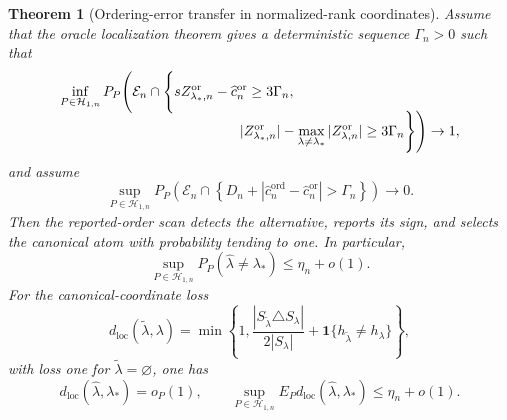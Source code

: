 \documentclass[11pt]{article}
\newtheorem{theorem}{Theorem}[section]
\theoremstyle{definition}
\newcommand{\1}{\mathbf 1}\newcommand{\op}{\operatorname}
\begin{document}
\begin{theorem}[Ordering-error transfer in normalized-rank coordinates]
Assume that the oracle localization theorem gives a deterministic
sequence $\Gamma_n>0$ such that
\begin{align}
 \inf_{P\in\mathcal H_{1,n}}
 P_P\Bigg(&\mathcal E_n\cap
 \Bigg\{
 sZ_{\lambda_*,n}^{\mathrm{or}}
   -\widehat c_n^{\mathrm{or}}\ge3\Gamma_n,
 \nonumber\\[-2mm]
 &\hspace{27mm}
 |Z_{\lambda_*,n}^{\mathrm{or}}|
 -\max_{\lambda\ne\lambda_*}
  |Z_{\lambda,n}^{\mathrm{or}}|
 \ge3\Gamma_n
 \Bigg\}\Bigg)\to1,
 \label{eq:T4-oracle-margin}
\end{align}
and assume
\begin{equation}
 \sup_{P\in\mathcal H_{1,n}}
 P_P\!\left(
  \mathcal E_n\cap
  \left\{
   D_n+|\widehat c_n^{\mathrm{ord}}
          -\widehat c_n^{\mathrm{or}}|>\Gamma_n
  \right\}
 \right)\to0.
 \label{eq:T4-margin-rate}
\end{equation}
Then the reported-order scan detects the alternative, reports its
sign, and selects the canonical atom with probability tending to one.
In particular,
\begin{equation}
 \sup_{P\in\mathcal H_{1,n}}
 P_P(\widehat\lambda\ne\lambda_*)
 \le\eta_n+o(1).
 \label{eq:T4-label-consistency}
\end{equation}
For the canonical-coordinate loss
\begin{equation}
 d_{\mathrm{loc}}(\widetilde\lambda,\lambda)
 =\min\!\left\{
  1,
  \frac{|S_{\widetilde\lambda}\triangle S_\lambda|}
       {2|S_\lambda|}
  +\mathbf 1\{h_{\widetilde\lambda}\ne h_\lambda\}
 \right\},
 \label{eq:T4-canonical-loss}
\end{equation}
with loss one for $\widetilde\lambda=\varnothing$, one has
\begin{equation}
 d_{\mathrm{loc}}(\widehat\lambda,\lambda_*)=o_P(1),
 \qquad
 \sup_{P\in\mathcal H_{1,n}}
 E_Pd_{\mathrm{loc}}(\widehat\lambda,\lambda_*)
 \le\eta_n+o(1).
 \label{eq:T4-canonical-localization}
\end{equation}


\end{theorem}
\end{document}
